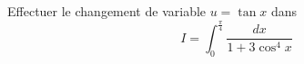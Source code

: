 Effectuer le changement de variable $u=\tan x$ dans
\begin{displaymath}
 I=\int_0^{\frac{\pi}{4}}\frac{dx}{1+3\cos^4 x}
\end{displaymath}
\bigskip \bigskip